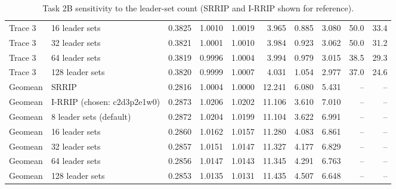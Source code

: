 \begin{table}[H]
{\begin{tabular}{llrrrrrrrr}
Trace 3 & 16 leader sets & 0.3825 & 1.0010 & 1.0019 & 3.965 & 0.885 & 3.080 & 50.0 & 33.4 \\
Trace 3 & 32 leader sets & 0.3821 & 1.0001 & 1.0010 & 3.984 & 0.923 & 3.062 & 50.0 & 31.2 \\
Trace 3 & 64 leader sets & 0.3819 & 0.9996 & 1.0004 & 3.994 & 0.979 & 3.015 & 38.5 & 29.3 \\
Trace 3 & 128 leader sets & 0.3820 & 0.9999 & 1.0007 & 4.031 & 1.054 & 2.977 & 37.0 & 24.6 \\
\midrule
Geomean & SRRIP & 0.2816 & 1.0004 & 1.0000 & 12.241 & 6.080 & 5.431 & -- & -- \\
Geomean & I-RRIP (chosen: c2d3p2e1w0) & 0.2873 & 1.0206 & 1.0202 & 11.106 & 3.610 & 7.010 & -- & -- \\
Geomean & 8 leader sets (default) & 0.2872 & 1.0204 & 1.0199 & 11.104 & 3.622 & 6.991 & -- & -- \\
Geomean & 16 leader sets & 0.2860 & 1.0162 & 1.0157 & 11.280 & 4.083 & 6.861 & -- & -- \\
Geomean & 32 leader sets & 0.2857 & 1.0151 & 1.0147 & 11.327 & 4.177 & 6.829 & -- & -- \\
Geomean & 64 leader sets & 0.2856 & 1.0147 & 1.0143 & 11.345 & 4.291 & 6.763 & -- & -- \\
Geomean & 128 leader sets & 0.2853 & 1.0135 & 1.0131 & 11.435 & 4.507 & 6.648 & -- & -- \\
\bottomrule
\end{tabular}}
\ifdim\wd\fitbx>\linewidth\resizebox{\linewidth}{!}{\usebox{\fitbx}}\else\usebox{\fitbx}\fi
\caption{Task 2B sensitivity to the leader-set count (SRRIP and I-RRIP shown for reference).}\label{tab:t2b_leaders}
\end{table}
